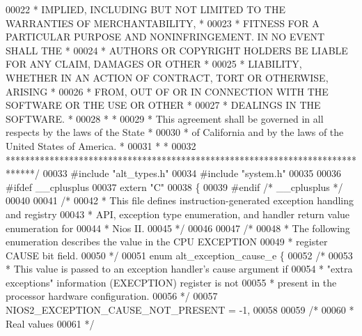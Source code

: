 \begin{DoxyCode}
00022 \textcolor{comment}{* IMPLIED, INCLUDING BUT NOT LIMITED TO THE WARRANTIES OF MERCHANTABILITY,    *}
00023 \textcolor{comment}{* FITNESS FOR A PARTICULAR PURPOSE AND NONINFRINGEMENT. IN NO EVENT SHALL THE *}
00024 \textcolor{comment}{* AUTHORS OR COPYRIGHT HOLDERS BE LIABLE FOR ANY CLAIM, DAMAGES OR OTHER      *}
00025 \textcolor{comment}{* LIABILITY, WHETHER IN AN ACTION OF CONTRACT, TORT OR OTHERWISE, ARISING     *}
00026 \textcolor{comment}{* FROM, OUT OF OR IN CONNECTION WITH THE SOFTWARE OR THE USE OR OTHER         *}
00027 \textcolor{comment}{* DEALINGS IN THE SOFTWARE.                                                   *}
00028 \textcolor{comment}{*                                                                             *}
00029 \textcolor{comment}{* This agreement shall be governed in all respects by the laws of the State   *}
00030 \textcolor{comment}{* of California and by the laws of the United States of America.              *}
00031 \textcolor{comment}{*                                                                             *}
00032 \textcolor{comment}{******************************************************************************/}
00033 \textcolor{preprocessor}{#include "alt_types.h"}
00034 \textcolor{preprocessor}{#include "system.h"}
00035 
00036 \textcolor{preprocessor}{#ifdef \_\_cplusplus}
00037 \textcolor{keyword}{extern} \textcolor{stringliteral}{"C"}
00038 \{
00039 \textcolor{preprocessor}{#endif }\textcolor{comment}{/* \_\_cplusplus */}\textcolor{preprocessor}{}
00040 
00041 \textcolor{comment}{/*}
00042 \textcolor{comment}{ * This file defines instruction-generated exception handling and registry}
00043 \textcolor{comment}{ * API, exception type enumeration, and handler return value enumeration for}
00044 \textcolor{comment}{ * Nios II.}
00045 \textcolor{comment}{ */}
00046 
00047 \textcolor{comment}{/*}
00048 \textcolor{comment}{ * The following enumeration describes the value in the CPU EXCEPTION}
00049 \textcolor{comment}{ * register CAUSE bit field.}
00050 \textcolor{comment}{ */}
00051 \textcolor{keyword}{enum} alt_exception_cause_e \{
00052   \textcolor{comment}{/*}
00053 \textcolor{comment}{   * This value is passed to an exception handler's cause argument if}
00054 \textcolor{comment}{   * "extra exceptions" information (EXECPTION) register is not}
00055 \textcolor{comment}{   * present in the processor hardware configuration.}
00056 \textcolor{comment}{   */}
00057   NIOS2_EXCEPTION_CAUSE_NOT_PRESENT            = -1,
00058 
00059   \textcolor{comment}{/*}
00060 \textcolor{comment}{   * Real values}
00061 \textcolor{comment}{   */}

\end{DoxyCode}
